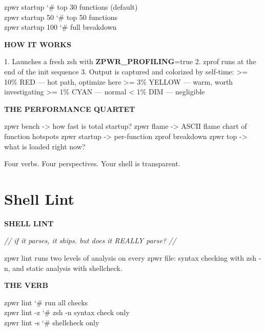 \documentclass[11pt,a4paper,twoside]{book}
\begin{document}
\begin{codebox}
\color{neongreen}zpwr startup               {\char`\#} top 30 functions (default)\\
\color{neongreen}zpwr startup 50            {\char`\#} top 50 functions\\
\color{neongreen}zpwr startup 100           {\char`\#} full breakdown\\
\end{codebox}


\vspace{12pt}
{\bfseries\color{neonyellow} HOW IT WORKS}\vspace{4pt}

1. Launches a fresh zsh with \textbf{ZPWR\_PROFILING}=true 2. zprof runs at the end of the init sequence 3. Output is captured and colorized by self-time: >= 10\%  RED       — hot path, optimize here >= 3\%   YELLOW    — warm, worth investigating >= 1\%   CYAN      — normal < 1\%    DIM       — negligible


\vspace{12pt}
{\bfseries\color{neonyellow} THE PERFORMANCE QUARTET}\vspace{4pt}

zpwr bench    -> how fast is total startup? zpwr flame    -> ASCII flame chart of function hotspots zpwr startup  -> per-function zprof breakdown zpwr top      -> what is loaded right now?

Four verbs. Four perspectives. Your shell is transparent.


\vspace{16pt}

\section{Shell Lint}


\vspace{10pt}
{\large\bfseries\color{neoncyan} SHELL LINT}\vspace{6pt}

{\small\itshape\color{dimtext} // if it parses, it ships. but does it REALLY parse? //}

zpwr lint runs two levels of analysis on every zpwr file: syntax checking with zsh -n, and static analysis with shellcheck.


\vspace{12pt}
{\bfseries\color{neonyellow} THE VERB}\vspace{4pt}

\begin{codebox}
\color{neongreen}zpwr lint                  {\char`\#} run all checks\\
\color{neongreen}zpwr lint -z               {\char`\#} zsh -n syntax check only\\
\color{neongreen}zpwr lint -s               {\char`\#} shellcheck only\\
\end{codebox}
\end{document}
